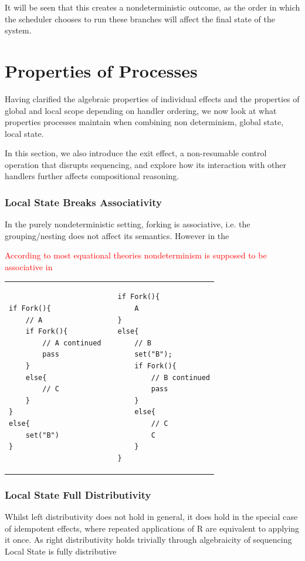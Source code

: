 \documentclass[logo,bsc,singlespacing,parskip]{infthesis}
\begin{document}
It will be seen that this creates a nondeterministic outcome, as the order in which the scheduler chooses to run these branches will affect the final state of the system. 




\section{Properties of Processes}

Having clarified the algebraic properties of individual effects and the properties of global and local scope depending on handler ordering, we now look at what properties processes maintain when combining  non determinism, global state, local state.

In this section, we also introduce the exit effect, a non-resumable control operation that disrupts sequencing, and explore how its interaction with other handlers further affects compositional reasoning.


\subsubsection*{Local State Breaks Associativity}

In the purely nondeterministic setting, forking is associative, i.e. the grouping/nesting does not affect its semantics. However in the 

\textcolor{red}{According to most equational theories nondeterminism is supposed to be associative in }

\begin{table}[H]
\centering
\begin{tabular}{p{} c p{}}
\begin{lstlisting}
if Fork(){
    // A
    if Fork(){
        // A continued
        pass
    }
    else{
        // C
    }
}
else{
    set("B")
}
\end{lstlisting}
&
&
\begin{lstlisting}
if Fork(){
    A
} 
else{
    // B
    set("B");
    if Fork(){
        // B continued
        pass
    }
    else{
        // C
        C
    }
}
\end{lstlisting}
\end{tabular}
\end{table}
\vspace{-2em}


\subsubsection*{Local State Full Distributivity}
Whilst left distributivity does not hold in general, it does hold in the special case of idempotent effects, where repeated applications of R are equivalent to applying it once. As right distributivity holds trivially through algebraicity of sequencing Local State is fully distributive 
\end{document}
